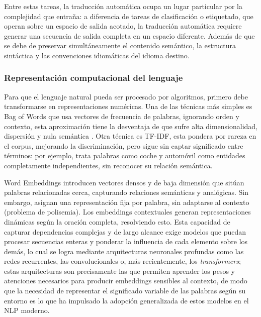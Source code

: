 Entre estas tareas, la traducción automática ocupa un lugar particular por la complejidad que entraña: a diferencia de tareas de clasificación o etiquetado, que operan sobre un espacio de salida acotado, la traducción automática requiere generar una secuencia de salida completa en un espacio diferente. Además de que se debe de preservar simultáneamente el contenido semántico, la estructura sintáctica y las convenciones idiomáticas del idioma destino. 

\subsubsection{Representación computacional del lenguaje}

Para que el lenguaje natural pueda ser procesado por algoritmos, primero debe transformarse en representaciones numéricas. Una de las técnicas más simples es Bag of Words que usa vectores de frecuencia de palabras, ignorando orden y contexto, esta aproximación tiene la desventaja de que sufre alta dimensionalidad, dispersión y nula semántica \cite{murel2023bagofwords}. Otra técnica es TF-IDF, esta pondera por rareza en el corpus, mejorando la discriminación, pero sigue sin captar significado entre términos: por ejemplo, trata palabras como coche y automóvil como entidades completamente independientes, sin reconocer su relación semántica.

Word Embeddings introducen vectores densos y de baja dimensión que sitúan palabras relacionadas cerca, capturando relaciones semánticas y analógicas. Sin embargo, asignan una representación fija por palabra, sin adaptarse al contexto (problema de polisemia). Los embeddings contextuales generan representaciones dinámicas según la oración completa, resolviendo esto. Esta capacidad de capturar dependencias complejas y de largo alcance exige modelos que puedan procesar secuencias enteras y ponderar la influencia de cada elemento sobre los demás, lo cual se logra mediante arquitecturas neuronales profundas como las redes recurrentes, las convolucionales o, más recientemente, los \textit{transformers}; estas arquitecturas son precisamente las que permiten aprender los pesos y atenciones necesarios para producir embeddings sensibles al contexto, de modo que la necesidad de representar el significado variable de las palabras según su entorno es lo que ha impulsado la adopción generalizada de estos modelos en el NLP moderno.

